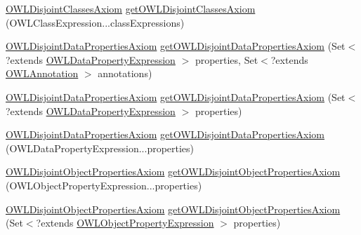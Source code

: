 \begin{DoxyCompactItemize}
\item 
\hyperlink{interfaceorg_1_1semanticweb_1_1owlapi_1_1model_1_1_o_w_l_disjoint_classes_axiom}{O\-W\-L\-Disjoint\-Classes\-Axiom} \hyperlink{classuk_1_1ac_1_1manchester_1_1cs_1_1owl_1_1owlapi_1_1_o_w_l_data_factory_impl_a1c93614d3ab4c562f6dcf4cfabeff515}{get\-O\-W\-L\-Disjoint\-Classes\-Axiom} (O\-W\-L\-Class\-Expression...\-class\-Expressions)
\item 
\hyperlink{interfaceorg_1_1semanticweb_1_1owlapi_1_1model_1_1_o_w_l_disjoint_data_properties_axiom}{O\-W\-L\-Disjoint\-Data\-Properties\-Axiom} \hyperlink{classuk_1_1ac_1_1manchester_1_1cs_1_1owl_1_1owlapi_1_1_o_w_l_data_factory_impl_a13e2de5acdbef2b0d80f6a6fd519893b}{get\-O\-W\-L\-Disjoint\-Data\-Properties\-Axiom} (Set$<$?extends \hyperlink{interfaceorg_1_1semanticweb_1_1owlapi_1_1model_1_1_o_w_l_data_property_expression}{O\-W\-L\-Data\-Property\-Expression} $>$ properties, Set$<$?extends \hyperlink{interfaceorg_1_1semanticweb_1_1owlapi_1_1model_1_1_o_w_l_annotation}{O\-W\-L\-Annotation} $>$ annotations)
\item 
\hyperlink{interfaceorg_1_1semanticweb_1_1owlapi_1_1model_1_1_o_w_l_disjoint_data_properties_axiom}{O\-W\-L\-Disjoint\-Data\-Properties\-Axiom} \hyperlink{classuk_1_1ac_1_1manchester_1_1cs_1_1owl_1_1owlapi_1_1_o_w_l_data_factory_impl_ad61dcbdcd5754300c9926635731dd252}{get\-O\-W\-L\-Disjoint\-Data\-Properties\-Axiom} (Set$<$?extends \hyperlink{interfaceorg_1_1semanticweb_1_1owlapi_1_1model_1_1_o_w_l_data_property_expression}{O\-W\-L\-Data\-Property\-Expression} $>$ properties)
\item 
\hyperlink{interfaceorg_1_1semanticweb_1_1owlapi_1_1model_1_1_o_w_l_disjoint_data_properties_axiom}{O\-W\-L\-Disjoint\-Data\-Properties\-Axiom} \hyperlink{classuk_1_1ac_1_1manchester_1_1cs_1_1owl_1_1owlapi_1_1_o_w_l_data_factory_impl_abfc2cc103ba0f923b4bb7c2493a2970c}{get\-O\-W\-L\-Disjoint\-Data\-Properties\-Axiom} (O\-W\-L\-Data\-Property\-Expression...\-properties)
\item 
\hyperlink{interfaceorg_1_1semanticweb_1_1owlapi_1_1model_1_1_o_w_l_disjoint_object_properties_axiom}{O\-W\-L\-Disjoint\-Object\-Properties\-Axiom} \hyperlink{classuk_1_1ac_1_1manchester_1_1cs_1_1owl_1_1owlapi_1_1_o_w_l_data_factory_impl_a7e9ddd956f0e1294ce7dcae931ece889}{get\-O\-W\-L\-Disjoint\-Object\-Properties\-Axiom} (O\-W\-L\-Object\-Property\-Expression...\-properties)
\item 
\hyperlink{interfaceorg_1_1semanticweb_1_1owlapi_1_1model_1_1_o_w_l_disjoint_object_properties_axiom}{O\-W\-L\-Disjoint\-Object\-Properties\-Axiom} \hyperlink{classuk_1_1ac_1_1manchester_1_1cs_1_1owl_1_1owlapi_1_1_o_w_l_data_factory_impl_ab2720c273d613037a8072df3352a2873}{get\-O\-W\-L\-Disjoint\-Object\-Properties\-Axiom} (Set$<$?extends \hyperlink{interfaceorg_1_1semanticweb_1_1owlapi_1_1model_1_1_o_w_l_object_property_expression}{O\-W\-L\-Object\-Property\-Expression} $>$ properties)

\end{DoxyCompactItemize}
